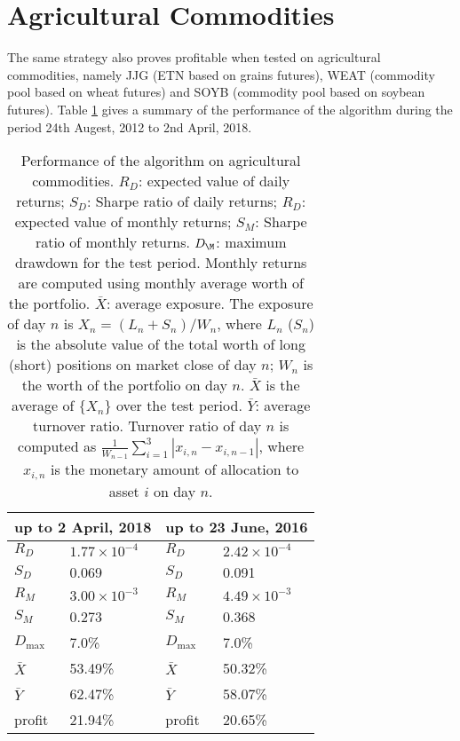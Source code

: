 \documentclass[12pt]{article}
\begin{document}
\section{Agricultural Commodities}
The same strategy also proves profitable when tested on agricultural
commodities, namely JJG (ETN based on grains futures), WEAT (commodity pool
based on wheat futures) and SOYB (commodity pool based on soybean
futures). Table \ref{tab:agricomm1} gives a summary of the performance
of the algorithm during the period 24th Augest, 2012 to 2nd April,
2018.
\begin{table}[htb!]
  \centering
  \begin{tabular}{ll||ll}
    \multicolumn{2}{c||}{up to 2 April, 2018}
    & \multicolumn{2}{c}{up to 23 June, 2016} \\
    \hline
    $R_D$ & $1.77 \times 10^{-4}$ & $R_D$ & $2.42 \times 10^{-4}$  \\
    $S_D$ & 0.069 & $S_D$ & 0.091 \\
    $R_M$ & $3.00 \times 10^{-3}$ & $R_M$ & $4.49 \times 10^{-3}$  \\
    $S_M$ & 0.273 & $S_M$ & 0.368 \\
    $D_{\text{max}}$ & 7.0\% & $D_{\text{max}}$ & 7.0\% \\
    $\bar X$ & 53.49\% & $\bar X$ & 50.32\% \\
    $\bar Y$ & 62.47\% & $\bar Y$ & 58.07\% \\
    profit & 21.94\% & profit & 20.65\% 
  \end{tabular}
  \caption{
    Performance of the algorithm on agricultural commodities.
    $R_D$: expected value of daily returns;
    $S_D$: Sharpe ratio of daily returns;
    $R_D$: expected value of monthly returns;
    $S_M$: Sharpe ratio of monthly returns.
    $D_\M$: maximum drawdown for the test period. Monthly
    returns are computed using monthly average worth of the
    portfolio.
    $\bar X$: average exposure. The exposure of day $n$ is
    $X_n = (L_n + S_n)/W_n$, where $L_n$ ($S_n$) is the absolute value
    of the total worth of long (short) positions on market close of
    day $n$; $W_n$ is the worth of the portfolio on day $n$. $\bar X$
    is the average of $\{X_n\}$ over the test period.
    $\bar Y$: average turnover ratio. Turnover ratio of day $n$ is
    computed as $\frac{1}{W_{n-1}}\sum_{i=1}^3 \left| x_{i, n} - x_{i,
        n-1} \right|$, where $x_{i, n}$ is the monetary amount of
    allocation to asset $i$ on day $n$.
  }
  \label{tab:agricomm1}
\end{table}
\end{document}
